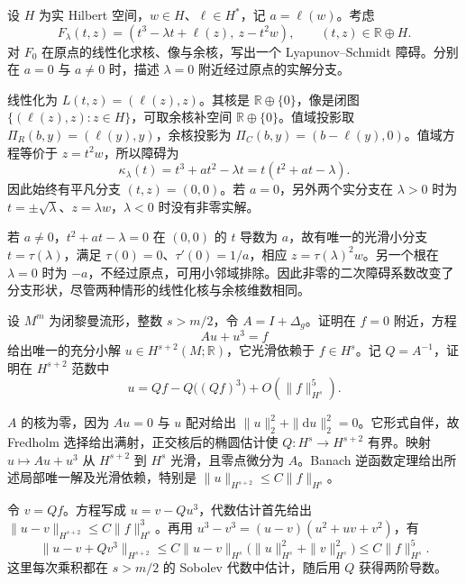 \begin{exercise}\label{g3:ex:lyapunov-schmidt-coupled-branch}
	设 \(H\) 为实 Hilbert 空间，\(w\in H\)、\(\ell\in H^*\)，记 \(a=\ell(w)\)。考虑
	\[
		F_\lambda(t,z)=(t^3-\lambda t+\ell(z),\ z-t^2w),
		\qquad(t,z)\in\mathbb R\oplus H.
	\]
	对 \(F_0\) 在原点的线性化求核、像与余核，写出一个 Lyapunov--Schmidt 障碍。分别在 \(a=0\) 与 \(a\ne0\) 时，描述 \(\lambda=0\) 附近经过原点的实解分支。
\end{exercise}
\begin{solution}
	线性化为 \(L(t,z)=(\ell(z),z)\)。其核是 \(\mathbb R\oplus\{0\}\)，像是闭图 \(\{(\ell(z),z):z\in H\}\)，可取余核补空间 \(\mathbb R\oplus\{0\}\)。值域投影取 \(\Pi_R(b,y)=(\ell(y),y)\)，余核投影为 \(\Pi_C(b,y)=(b-\ell(y),0)\)。值域方程等价于 \(z=t^2w\)，所以障碍为
	\[
		\kappa_\lambda(t)=t^3+a t^2-\lambda t
		=t(t^2+a t-\lambda).
	\]
	因此始终有平凡分支 \((t,z)=(0,0)\)。若 \(a=0\)，另外两个实分支在 \(\lambda>0\) 时为
	\(t=\pm\sqrt\lambda\)、\(z=\lambda w\)，\(\lambda<0\) 时没有非零实解。

	若 \(a\ne0\)，\(t^2+at-\lambda=0\) 在 \((0,0)\) 的 \(t\) 导数为 \(a\)，故有唯一的光滑小分支 \(t=\tau(\lambda)\)，满足 \(\tau(0)=0\)、\(\tau'(0)=1/a\)，相应 \(z=\tau(\lambda)^2w\)。另一个根在 \(\lambda=0\) 时为 \(-a\)，不经过原点，可用小邻域排除。因此非零的二次障碍系数改变了分支形状，尽管两种情形的线性化核与余核维数相同。
\end{solution}

\begin{exercise}\label{g3:ex:semilinear-cubic-expansion}
	设 \(M^m\) 为闭黎曼流形，整数 \(s>m/2\)，令 \(A=I+\Delta_g\)。证明在 \(f=0\) 附近，方程
	\[
		Au+u^3=f
	\]
	给出唯一的充分小解 \(u\in H^{s+2}(M;\mathbb R)\)，它光滑依赖于 \(f\in H^s\)。记 \(Q=A^{-1}\)，证明在 \(H^{s+2}\) 范数中
	\[
		u=Qf-Q\bigl((Qf)^3\bigr)+O(\|f\|_{H^s}^5).
	\]
\end{exercise}
\begin{solution}
	\(A\) 的核为零，因为 \(Au=0\) 与 \(u\) 配对给出 \(\|u\|_2^2+\|\mathrm du\|_2^2=0\)。它形式自伴，故 Fredholm 选择给出满射，正交核后的椭圆估计使 \(Q:H^s\to H^{s+2}\) 有界。映射 \(u\mapsto Au+u^3\) 从 \(H^{s+2}\) 到 \(H^s\) 光滑，且零点微分为 \(A\)。Banach 逆函数定理给出所述局部唯一解及光滑依赖，特别是 \(\|u\|_{H^{s+2}}\le C\|f\|_{H^s}\)。

	令 \(v=Qf\)。方程写成 \(u=v-Qu^3\)，代数估计首先给出
	\(\|u-v\|_{H^{s+2}}\le C\|f\|_{H^s}^3\)。再用
	\(u^3-v^3=(u-v)(u^2+uv+v^2)\)，有
	\[
		\|u-v+Qv^3\|_{H^{s+2}}
		\le C\|u-v\|_{H^s}
		\bigl(\|u\|_{H^s}^2+\|v\|_{H^s}^2\bigr)
		\le C\|f\|_{H^s}^5.
	\]
	这里每次乘积都在 \(s>m/2\) 的 Sobolev 代数中估计，随后用 \(Q\) 获得两阶导数。
\end{solution}

